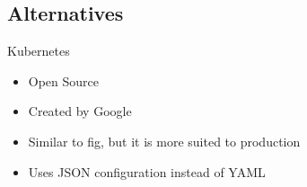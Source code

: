 \documentclass{beamer}
\begin{document}
    \subsection{Alternatives}
    \begin{frame}{Kubernetes}
        \begin{itemize}
            \item Open Source
            \item Created by Google
            \item Similar to fig, but it is more suited to production
            \item Uses JSON configuration instead of YAML
        \end{itemize}
    \end{frame}
\end{document}
